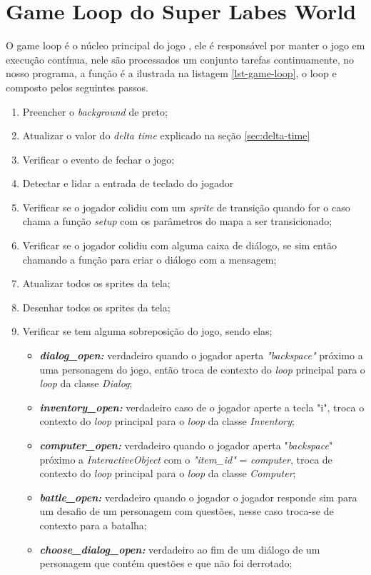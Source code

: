 \section{Game Loop do Super Labes World}
\label{sec:game-loop-super-labes-world}

\newpage
O game loop é o núcleo principal do jogo , ele é responsável por manter o jogo em execução contínua, nele são processados um conjunto tarefas continuamente, no nosso programa, a função é a ilustrada na listagem \ref{lst-game-loop}, o loop e composto pelos seguintes passos.
\begin{enumerate}
    \item Preencher o \textit{background} de preto;
    \item Atualizar o valor do \textit{delta time} explicado na seção \ref{sec:delta-time}
    \item Verificar o evento de fechar o jogo;
    \item Detectar e lidar a entrada de teclado do jogador
    \item Verificar se o jogador colidiu com um \textit{sprite} de transição quando for o caso chama a função \textit{setup} com os parâmetros do mapa a ser transicionado;
    \item Verificar se o jogador colidiu com alguma caixa de diálogo, se sim então chamando a função para criar o diálogo com a mensagem;
    \item Atualizar todos os sprites da tela; 
    \item Desenhar todos os sprites da tela;
    \item Verificar se tem alguma sobreposição do jogo, sendo elas;
        \begin{itemize}
        \item \textit{\textbf{dialog\_open: }} verdadeiro quando o jogador aperta \textit{"backspace"} 
        próximo a uma personagem do jogo, então troca de contexto do \textit{loop} principal para o \textit{loop} da classe \textit{Dialog};
        \item \textit{\textbf{inventory\_open: }}verdadeiro caso de o jogador aperte a tecla "i", troca o contexto do \textit{loop} principal para o \textit{loop} da classe \textit{Inventory}; 
        \item \textit{\textbf{computer\_open: }} verdadeiro quando o jogador aperta "\textit{backspace}" próximo a \textit{InteractiveObject} com o \textit{"item\_id"} = \textit{computer}, troca de contexto do \textit{loop} principal para o \textit{loop} da classe \textit{Computer};
        \item \textit{\textbf{battle\_open: }}  verdadeiro quando o jogador o jogador responde sim para um desafio de um personagem com questões, nesse caso troca-se de contexto para a batalha;
        \item \textit{\textbf{choose\_dialog\_open: }} verdadeiro ao fim de um diálogo de um personagem que contém questões e que não foi derrotado;
    \end{itemize}
\end{enumerate}
